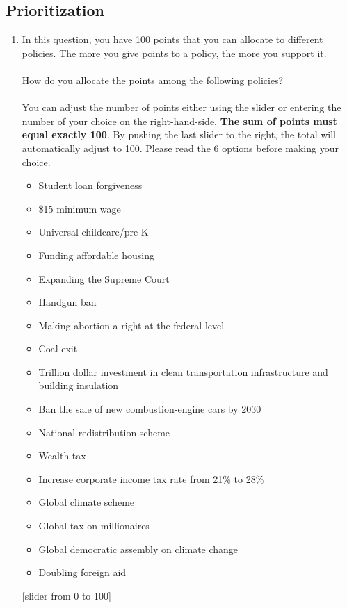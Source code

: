 \subsection*{Prioritization}
\begin{enumerate}[resume] \item In this question, you have 100 points that you can allocate to different policies. The more you give points to a policy, the more you support it.\\
   \\
    How do you allocate the points among the following policies?  \\
    \\
    You can adjust the number of points either using the slider or entering the number of your choice on the right-hand-side. \textbf{The sum of points must equal exactly 100}. By pushing the last slider to the right, the total will automatically adjust to 100. Please read the 6 options before making your choice.
\begin{itemize}
    \item Student loan forgiveness
    \item \$15 minimum wage 
    \item Universal childcare/pre-K 
    \item Funding affordable housing 
    \item Expanding the Supreme Court 
    \item Handgun ban 
    \item Making abortion a right at the federal level 
    \item Coal exit 
    \item Trillion dollar investment in clean transportation infrastructure and building insulation 
    \item Ban the sale of new combustion-engine cars by 2030 
    \item National redistribution scheme 
    \item Wealth tax 
    \item Increase corporate income tax rate from 21\% to 28\% 
    \item Global climate scheme 
    \item Global tax on millionaires 
    \item Global democratic assembly on climate change 
    \item Doubling foreign aid 
\end{itemize}
[slider from 0 to 100]
\end{enumerate}

